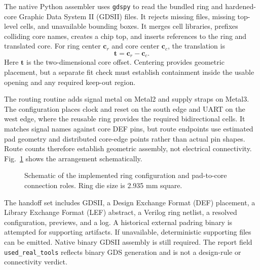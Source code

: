 ﻿\documentclass[conference,letterpaper]{IEEEtran}
\begin{document}
The native Python assembler uses \texttt{gdspy} to read the bundled ring and hardened-core Graphic Data System II (GDSII) files. It rejects missing files, missing top-level cells, and unavailable bounding boxes. It merges cell libraries, prefixes colliding core names, creates a chip top, and inserts references to the ring and translated core. For ring center $\mathbf{c}_r$ and core center $\mathbf{c}_c$, the translation is
\begin{equation}
\mathbf{t}=\mathbf{c}_r-\mathbf{c}_c .
\label{eq:center}
\end{equation}
Here $\mathbf{t}$ is the two-dimensional core offset. Centering provides geometric placement, but a separate fit check must establish containment inside the usable opening and any required keep-out region.

The routing routine adds signal metal on Metal2 and supply straps on Metal3. The configuration places clock and reset on the south edge and UART on the west edge, where the reusable ring provides the required bidirectional cells. It matches signal names against core DEF pins, but route endpoints use estimated pad geometry and distributed core-edge points rather than actual pin shapes. Route counts therefore establish geometric assembly, not electrical connectivity. Fig.~\ref{fig:ring} shows the arrangement schematically.

\begin{figure}[t]
\centering
{}
\caption{Schematic of the implemented ring configuration and pad-to-core connection roles. Ring die size is 2.935 mm square.}
\label{fig:ring}
\end{figure}

The handoff set includes GDSII, a Design Exchange Format (DEF) placement, a Library Exchange Format (LEF) abstract, a Verilog ring netlist, a resolved configuration, previews, and a log. A historical external padring binary is attempted for supporting artifacts. If unavailable, deterministic supporting files can be emitted. Native binary GDSII assembly is still required. The report field \texttt{used\_real\_tools} reflects binary GDS generation and is not a design-rule or connectivity verdict.
\end{document}
